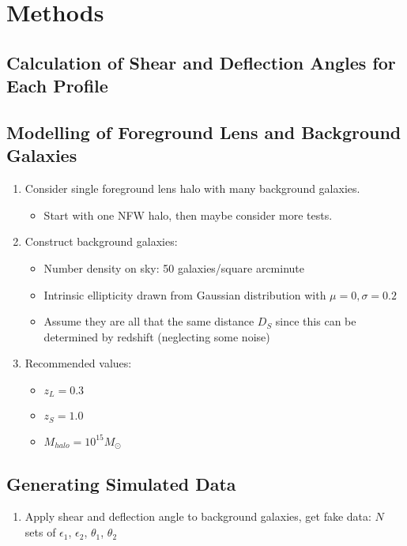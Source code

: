 \documentclass[10pt]{article}
\begin{document}
\newpage

\section{Methods}
\subsection{Calculation of Shear and Deflection Angles for Each Profile}

\subsection{Modelling of Foreground Lens and Background Galaxies}
\begin{enumerate}
    \item Consider single foreground lens halo with many background galaxies.
    \begin{itemize}
        \item Start with one NFW halo, then maybe consider more tests.
    \end{itemize}
    \item Construct background galaxies:
    \begin{itemize}
        \item Number density on sky: 50 galaxies/square arcminute
        \item Intrinsic ellipticity drawn from Gaussian distribution with $\mu=0, \sigma=0.2$
        \item Assume they are all that the same distance $D_S$ since this can be determined by redshift (neglecting some noise)
    \end{itemize}
    \item Recommended values:
    \begin{itemize}
        \item $z_L = 0.3$
        \item $z_S = 1.0$
        \item $M_{halo} = 10^{15} M_\odot$
    \end{itemize}
\end{enumerate}

\subsection{Generating Simulated Data}
\begin{enumerate}
\item Apply shear and deflection angle to background galaxies, get fake data: $N$ sets of $\epsilon_1$, $\epsilon_2$, $\theta_1$, $\theta_2$
\end{enumerate}
\end{document}

